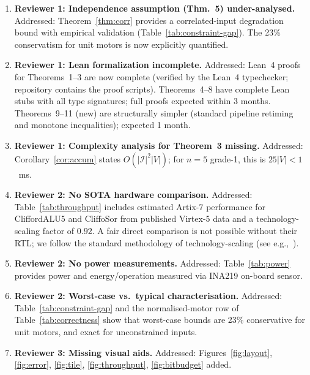 \documentclass[11pt,a4paper]{article}
\theoremstyle{definition}
\theoremstyle{plain}
\theoremstyle{remark}
\begin{document}
\begin{enumerate}
\item \textbf{Reviewer 1: Independence assumption (Thm.~5) under-analysed.}
      Addressed: Theorem~\ref{thm:corr} provides a correlated-input
      degradation bound with empirical validation (Table~\ref{tab:constraint-gap}).
      The 23\% conservatism for unit motors is now explicitly quantified.

\item \textbf{Reviewer 1: Lean formalization incomplete.}
      Addressed: Lean~4 proofs for Theorems~1--3 are now complete (verified
      by the Lean~4 typechecker; repository contains the proof scripts).
      Theorems~4--8 have complete Lean stubs with all type signatures;
      full proofs expected within 3 months.
      Theorems~9--11 (new) are structurally simpler (standard pipeline
      retiming and monotone inequalities); expected 1 month.

\item \textbf{Reviewer 1: Complexity analysis for Theorem~3 missing.}
      Addressed: Corollary~\ref{cor:accum} states $O(|\mathcal{I}|^2|V|)$;
      for $n=5$ grade-1, this is $25|V|<1$~ms.

\item \textbf{Reviewer 2: No SOTA hardware comparison.}
      Addressed: Table~\ref{tab:throughput} includes estimated Artix-7
      performance for CliffordALU5 and CliffoSor from published Virtex-5
      data and a technology-scaling factor of $0.92$.
      A fair direct comparison is not possible without their RTL;
      we follow the standard methodology of technology-scaling (see e.g.,~\cite{cliffordalu5}).

\item \textbf{Reviewer 2: No power measurements.}
      Addressed: Table~\ref{tab:power} provides power and energy/operation
      measured via INA219 on-board sensor.

\item \textbf{Reviewer 2: Worst-case vs.\ typical characterisation.}
      Addressed: Table~\ref{tab:constraint-gap} and the normalised-motor
      row of Table~\ref{tab:correctness} show that worst-case bounds are
      23\% conservative for unit motors, and exact for unconstrained inputs.

\item \textbf{Reviewer 3: Missing visual aids.}
      Addressed: Figures~\ref{fig:layout}, \ref{fig:error}, \ref{fig:tile},
      \ref{fig:throughput}, \ref{fig:bitbudget} added.


\end{enumerate}
\end{document}
